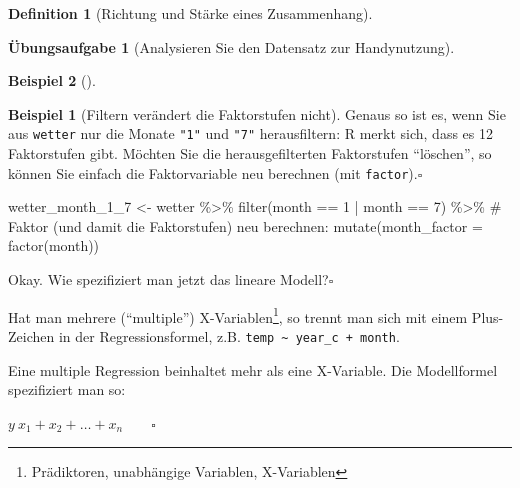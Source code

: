 \documentclass[
  a4paper,
  DIV=11]{scrreprt}
\newenvironment{Shaded}{\begin{snugshade}}{\end{snugshade}}
\newcommand{\AttributeTok}[1]{\textcolor[rgb]{0.40,0.45,0.13}{#1}}
\newcommand{\CommentTok}[1]{\textcolor[rgb]{0.37,0.37,0.37}{#1}}
\newcommand{\DecValTok}[1]{\textcolor[rgb]{0.68,0.00,0.00}{#1}}
\newcommand{\FunctionTok}[1]{\textcolor[rgb]{0.28,0.35,0.67}{#1}}
\newcommand{\NormalTok}[1]{\textcolor[rgb]{0.00,0.23,0.31}{#1}}
\newcommand{\OtherTok}[1]{\textcolor[rgb]{0.00,0.23,0.31}{#1}}
\newcommand{\SpecialCharTok}[1]{\textcolor[rgb]{0.37,0.37,0.37}{#1}}
\theoremstyle{definition}
\newtheorem{exercise}{Übungsaufgabe}[chapter]
\theoremstyle{definition}
\newtheorem{example}{Beispiel}[chapter]
\theoremstyle{definition}
\newtheorem{definition}{Definition}[chapter]
\theoremstyle{remark}
\begin{document}
\begin{definition}[Richtung und Stärke eines
Zusammenhang]
\begin{exercise}[Analysieren Sie den Datensatz zur
Handynutzung]
\begin{example}[]
\begin{example}[Filtern verändert die Faktorstufen
nicht]
Genaus so ist es, wenn Sie aus \texttt{wetter} nur die Monate
\texttt{"1"} und \texttt{"7"} herausfiltern: R merkt sich, dass es 12
Faktorstufen gibt. Möchten Sie die herausgefilterten Faktorstufen
``löschen'', so können Sie einfach die Faktorvariable neu berechnen (mit
\texttt{factor}).\(\square\)

\end{example}

\begin{Shaded}
\begin{Highlighting}[]
\NormalTok{wetter\_month\_1\_7 }\OtherTok{\textless{}{-}}
\NormalTok{  wetter }\SpecialCharTok{\%\textgreater{}\%} 
  \FunctionTok{filter}\NormalTok{(month }\SpecialCharTok{==} \DecValTok{1}  \SpecialCharTok{|}\NormalTok{ month }\SpecialCharTok{==} \DecValTok{7}\NormalTok{) }\SpecialCharTok{\%\textgreater{}\%} 
  \CommentTok{\# Faktor (und damit die Faktorstufen) neu berechnen:}
  \FunctionTok{mutate}\NormalTok{(}\AttributeTok{month\_factor =} \FunctionTok{factor}\NormalTok{(month))}
\end{Highlighting}
\end{Shaded}

Okay. Wie spezifiziert man jetzt das lineare Modell?\(\square\)

\end{example}

Hat man mehrere (``multiple'') X-Variablen\footnote{Prädiktoren,
  unabhängige Variablen, X-Variablen}, so trennt man sich mit einem
Plus-Zeichen in der Regressionsformel, z.B.
\texttt{temp\ \textasciitilde{}\ year\_c\ +\ month}.

\begin{tcolorbox}[enhanced jigsaw, leftrule=.75mm, opacitybacktitle=0.6, colback=white, colframe=quarto-callout-important-color-frame, coltitle=black, colbacktitle=quarto-callout-important-color!10!white, opacityback=0, left=2mm, breakable, titlerule=0mm, toptitle=1mm, bottomtitle=1mm, rightrule=.15mm, title=\textcolor{quarto-callout-important-color}{\faExclamation}\hspace{0.5em}{Multiple Regression}, arc=.35mm, bottomrule=.15mm, toprule=.15mm]

Eine multiple Regression beinhaltet mehr als eine X-Variable. Die
Modellformel spezifiziert man so:

\(y ~ x_1 + x_2 + \ldots + x_n \qquad \square\)

\end{tcolorbox}

\begin{tcolorbox}[enhanced jigsaw, leftrule=.75mm, opacitybacktitle=0.6, colback=white, colframe=quarto-callout-note-color-frame, coltitle=black, colbacktitle=quarto-callout-note-color!10!white, opacityback=0, left=2mm, breakable, titlerule=0mm, toptitle=1mm, bottomtitle=1mm, rightrule=.15mm, title=\textcolor{quarto-callout-note-color}{\faInfo}\hspace{0.5em}{Modellgleichung}, arc=.35mm, bottomrule=.15mm, toprule=.15mm]


\end{tcolorbox}
\end{exercise}
\end{definition}
\end{document}

